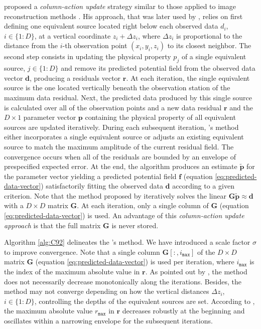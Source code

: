 \documentclass[utf8]{FrontiersinHarvard} %
\begin{document}
	\cite{cordell1992} proposed a \textit{column-action update} strategy similar to those applied 
	to image reconstruction methods \citep[e.g.,][]{elfving-etal2017}.
	His approach, that was later used by \cite{guspi-novara2009}, relies on
	first defining one equivalent source located right below each observed data $d_{i}$, $i \in \{1:D\}$, at a vertical
	coordinate $z_{i} + \Delta z_{i}$, where $\Delta z_{i}$ is proportional to the distance from the $i$-th observation point 
	$(x_{i}, y_{i}, z_{i})$ to its closest neighbor.
	The second step consists in updating the physical property $p_{j}$ of a single equivalent source, $j \in \{1:D\}$ and 
	remove its predicted potential field from the observed data vector $\mathbf{d}$, producing a residuals vector $\mathbf{r}$.
	At each iteration, the single equivalent source is the one located vertically beneath the observation station of the maximum data residual. 
	Next, the predicted data produced by this single source is calculated over all of the observation points and 
	a new data residual $\mathbf{r}$ and the $D \times 1$ parameter vector $\mathbf{p}$ containing the physical property 
	of all equivalent sources are updated iteratively. 
	During each subsequent iteration,  \citeauthor{cordell1992}'s method 
	either incorporates a single equivalent source or adjusts an existing equivalent source to match the maximum amplitude 
	of the current residual field.
	The convergence occurs when all of the residuals are bounded by an envelope of prespecified expected error.
	At the end, the algorithm produces an estimate $\tilde{\mathbf{p}}$ for the parameter vector yielding a predicted
	potential field $\mathbf{f}$ (equation \ref{eq:predicted-data-vector}) satisfactorily fitting the observed data
	$\mathbf{d}$ according to a given criterion.
	Note that the method proposed by \cite{cordell1992} iteratively solves the linear $\mathbf{G} \tilde{\mathbf{p}} \approx \mathbf{d}$
	with a $D \times D$ matrix $\mathbf{G}$. At each iteration, only a single column of $\mathbf{G}$ (equation \ref{eq:predicted-data-vector}) 
	is used.
	An advantage of this \textit{column-action update approach} is that the full matrix $\mathbf{G}$ is never stored.
	
	Algorithm \ref{alg:C92} delineates the \citeauthor{cordell1992}'s method.
	We have introduced a scale factor $\sigma$ to improve convergence. 
	Note that a single column $\mathbf{G}[:, i_{\mathtt{max}}]$ of the $D \times D$ matrix $\mathbf{G}$ (equation \ref{eq:predicted-data-vector})
	is used per iteration, where $i_{\mathtt{max}}$ is the index of the maximum absolute value in $\mathbf{r}$.
	As pointed out by \cite{cordell1992}, the method does not necessarily decrease monotonically along the iterations.
	Besides, the method may not converge depending on how the vertical distances $\Delta z_{i}$, $i \in \{1:D\}$, 
	controlling the depths of the equivalent sources are set.
	According to \cite{cordell1992}, the maximum absolute value $r_{\mathtt{max}}$ in $\mathbf{r}$ decreases robustly at the beginning 
	and oscillates within a narrowing envelope for the subsequent iterations.
	
\end{document}
